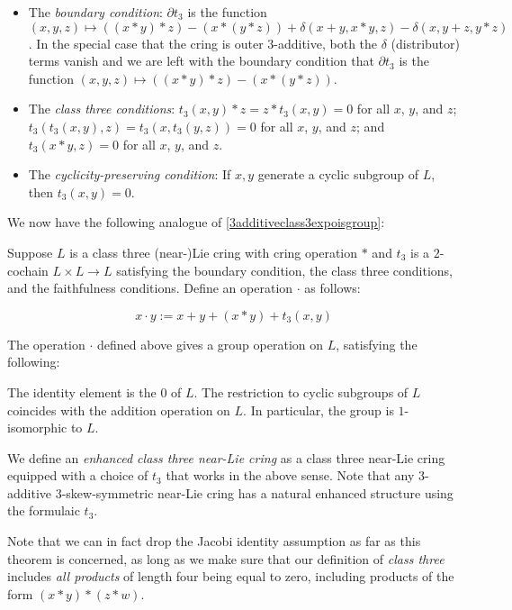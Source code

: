 \documentclass[10pt]{amsart}
\begin{document}
\begin{itemize}
\item The {\em boundary condition}: $\partial t_3$ is the function
  $(x,y,z) \mapsto ((x * y) * z) - (x * (y * z)) + \delta(x + y, x *
  y,z) - \delta(x, y + z, y * z)$. In the special case that the cring
  is outer $3$-additive, both the $\delta$ (distributor) terms vanish
  and we are left with the boundary condition that $\partial t_3$ is
  the function $(x,y,z) \mapsto ((x * y) * z) - (x * (y * z))$.
\item The {\em class three conditions}: $t_3(x,y) * z = z * t_3(x,y) =
  0$ for all $x$, $y$, and $z$; $t_3(t_3(x,y),z) = t_3(x,t_3(y,z)) =
  0$ for all $x$, $y$, and $z$; and $t_3(x*y,z) = 0$ for all $x$, $y$,
  and $z$.
\item The {\em cyclicity-preserving condition}: If $x,y$ generate a
  cyclic subgroup of $L$, then $t_3(x,y) = 0$.
\end{itemize}

We now have the following analogue of
\ref{3additiveclass3expoisgroup}:

\begin{lemma}\label{3additivet3chosenexpoisgroup}
  Suppose $L$ is a class three (near-)Lie cring
  with cring operation $*$ and $t_3$ is a $2$-cochain $L \times L \to
  L$ satisfying the boundary condition, the class three conditions,
  and the faithfulness conditions. Define an operation $\cdot$ as
  follows:

  $$x \cdot y := x + y + (x * y) + t_3(x,y)$$

  The operation $\cdot$ defined above gives a group
  operation on $L$, satisfying the following:

  The identity element is the $0$ of $L$. The restriction to
  cyclic subgroups of $L$ coincides with the addition operation on
  $L$. In particular, the group is $1$-isomorphic to $L$.
\end{lemma}

We define an {\em enhanced class three near-Lie cring} as a class
three near-Lie cring equipped with a choice of $t_3$ that works in the
above sense. Note that any $3$-additive $3$-skew-symmetric near-Lie
cring has a natural enhanced structure using the formulaic $t_3$.

Note that we can in fact drop the Jacobi identity assumption as far as
this theorem is concerned, as long as we make sure that our definition
of {\em class three} includes {\em all products} of length four being
equal to zero, including products of the form $(x * y) * (z * w)$.
\end{document}
